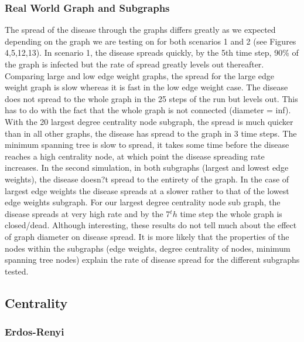 \documentclass[a4paper,11pt]{article}
\begin{document}
\subsubsection*{Real World Graph and Subgraphs}
The spread of the disease through the graphs differs greatly as we expected depending on the graph we are testing on for both scenarios 1 and 2 (see Figures 4,5,12,13). In scenario 1, the disease spreads quickly, by the 5th time step, 90\% of the graph is infected but the rate of spread greatly levels out thereafter. Comparing large and low edge weight graphs, the spread for the large edge weight graph is slow whereas it is fast in the low edge weight case. The disease does not spread to the whole graph in the 25 steps of the run but levels out. This has to do with the fact that the whole graph is not connected (diameter = inf). With the 20 largest degree centrality node subgraph, the spread is much quicker than in all other graphs, the disease has spread to the graph in 3 time steps. The minimum spanning tree is slow to spread, it takes some time before the disease reaches a high centrality node, at which point the disease spreading rate increases. 
In the second simulation, in both subgraphs (largest and lowest edge weights), the disease doesn?t spread to the entirety of the graph. In the case of largest edge weights the disease spreads at a slower rather to that of the lowest edge weights subgraph. For our largest degree centrality node sub graph, the disease spreads at very high rate and by the 7$^th$ time step the whole graph is closed/dead.
Although interesting, these results do not tell much about the effect of graph diameter on disease spread. It is more likely that the properties of the nodes within the subgraphs (edge weights, degree centrality of nodes, minimum spanning tree nodes) explain the rate of disease spread for the different subgraphs tested.

\subsection*{Centrality}
\subsubsection*{Erdos-Renyi}
\end{document}
